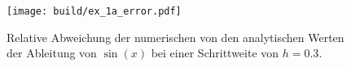 \begin{figure}
    \centering
    \texttt{[image: build/ex\_1a\_error.pdf]}
    \caption{Relative Abweichung der numerischen von den analytischen Werten der Ableitung von $\sin(x)$
    bei einer Schrittweite von $h=0.3$.}
    \label{fig:rel_a}
\end{figure}
\FloatBarrier
%
%
%
%
%
%
%